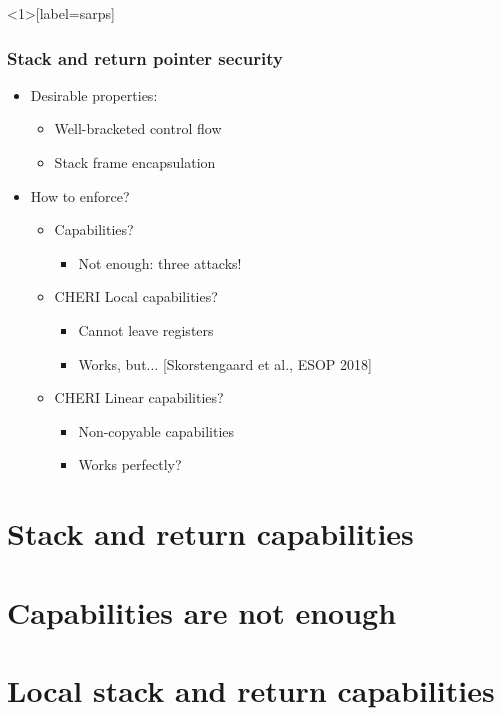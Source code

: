 \documentclass{beamer}
\begin{document}
\begin{frame}<1>[label=sarps]
  \frametitle{Stack and return pointer security}
  \begin{itemize}
  \item Desirable properties:
    \begin{itemize}
    \item Well-bracketed control flow
    \item Stack frame encapsulation
    \end{itemize}
  \item How to enforce?
    \begin{itemize}
    \item Capabilities?
      \begin{itemize}
      \item<2-> Not enough: three attacks!
      \end{itemize}
    \item<3-> CHERI Local capabilities?
      \begin{itemize}
      \item Cannot leave registers
      \item<4-> Works, but... [Skorstengaard et al., ESOP 2018]
      \end{itemize}
    \item<5-> CHERI Linear capabilities?
      \begin{itemize}
      \item Non-copyable capabilities
      \item<6> Works perfectly?
      \end{itemize}
    \end{itemize}
  \end{itemize}
\end{frame}

\section{Stack and return capabilities}


\section{Capabilities are not enough}


\section{Local stack and return capabilities}

\end{document}
